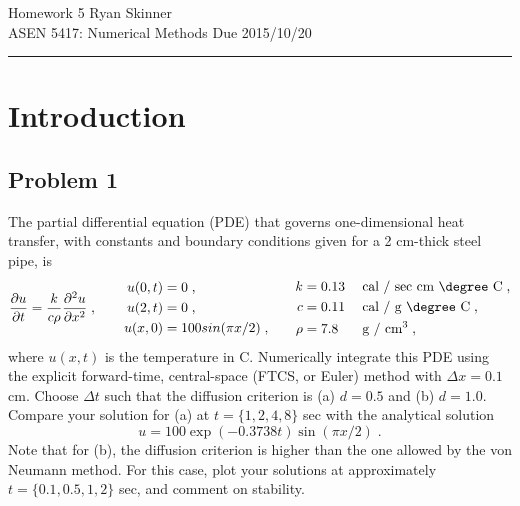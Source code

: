 \documentclass[11pt]{article}
\begin{document}
\pagestyle{fancyplain}
\lhead{}
\chead{}
\rhead{}
\cfoot{\hrule \thepage}

\noindent
{\Large Homework 5}
\hfill
{\large Ryan Skinner}
\\[0.5ex]
{\large ASEN 5417: Numerical Methods}
\hfill
{\large Due 2015/10/20}\\
\hrule
\vspace{6pt}

\section{Introduction} %

\subsection{Problem 1}

The partial differential equation (PDE) that governs one-dimensional heat transfer, with constants and boundary conditions given for a 2 cm-thick steel pipe, is
\begin{equation}
\frac{\partial u}{\partial t} = \frac{k}{c \rho} \frac{\partial^2 u}{\partial x^2}
\;,
\qquad
\begin{aligned}
u(0,t) &= 0 \;, \\
u(2,t) &= 0 \;, \\
u(x,0) &= 100 sin(\pi x / 2) \;,
\end{aligned}
\qquad
\begin{aligned}
k &= 0.13 \; &&\text{cal / sec cm \degree C} \;, \\
c &= 0.11 \; &&\text{cal / g \degree C} \;, \\
\rho &= 7.8 \; &&\text{g / cm$^3$}
\;,
\end{aligned}
\label{eq:prob1}
\end{equation}
where $u(x,t)$ is the temperature in \degree C. Numerically integrate this PDE using the explicit forward-time, central-space (FTCS, or Euler) method with $\Delta x = 0.1$ cm. Choose $\Delta t$ such that the diffusion criterion is (a) $d = 0.5$ and (b) $d = 1.0$. Compare your solution for (a) at $t = \{1, 2, 4, 8\}$ sec with the analytical solution
\begin{equation}
u = 100 \exp(-0.3738t) \sin(\pi x / 2)
\;.
\label{eq:prob1_analytic}
\end{equation}
Note that for (b), the diffusion criterion is higher than the one allowed by the von Neumann method. For this case, plot your solutions at approximately $t = \{0.1, 0.5, 1, 2\}$ sec, and comment on stability.
\end{document}
